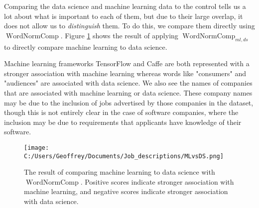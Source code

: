 \documentclass[12pt]{article}
\DeclareMathOperator{\WNp}{WordNormComp}
\begin{document}
Comparing the data science and machine learning data to the control tells us a lot about what is important to each of them, but due to their large overlap, it does not allow us to \textit{distinguish} them. To do this, we compare them directly using $\WNp$. Figure \ref{fig:WNp} shows the result of applying $\WNp_{ml,ds}$ to directly compare machine learning to data science.

Machine learning frameworks TensorFlow and Caffe are both represented with a stronger association with machine learning whereas words like "consumers" and "audiences" are associated with data science. We also see the names of companies that are associated with machine learning or data science. These company names may be due to the inclusion of jobs advertised by those companies in the dataset, though this is not entirely clear in the case of software companies, where the inclusion may be due to requirements that applicants have knowledge of their software. 

\begin{figure}[h]
\begin{center}
\texttt{[image: C:/Users/Geoffrey/Documents/Job\_descriptions/MLvsDS.png]}
\end{center}
\caption{\label{fig:WNp} The result of comparing machine learning to data science with $\WNp$. Positive scores indicate stronger association with machine learning, and negative scores indicate stronger association with data science.}
\end{figure}
\end{document}
